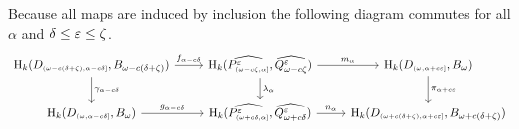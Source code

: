 

Because all maps are induced by inclusion the following diagram commutes for all $\alpha$ and $\delta\leq\varepsilon\leq\zeta$.
\begin{equation}\label{dgm:interleaving2}
\begin{tikzcd}
  \hom_k(D\subi{\omega-c(\delta+\zeta), \alpha-c\of}, \b)\arrow{r}{f_{\alpha-c\delta}}\arrow{d}{\gamma_{\alpha-c\delta}} &
  \hom_k(\ext{P^\e\subi{\omega-c\zeta,\alpha}},\ext{\Q^\e})\arrow{r}{m_\alpha}\arrow{d}{\lambda_\alpha} &
  \hom_k(D\subi{\omega,\alpha+c\e}, \B)\arrow{d}{\pi_{\alpha+c\e}}\\
  \hom_k(D\subi{\omega,\alpha-c\of}, \B)\arrow{r}{g_{\alpha-c\of}} &
  \hom_k(\ext{P^\e\subi{\omega+c\of,\alpha}}, \ext{\QQ^\e})\arrow{r}{n_\alpha} &
  \hom_k(D\subi{\omega+c(\delta+\zeta),\alpha+c\e}, \BB)
\end{tikzcd}\end{equation}

